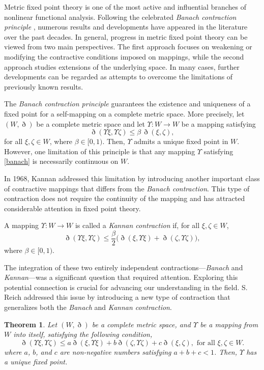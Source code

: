 \documentclass[pdflatex,sn-mathphys-num]{sn-jnl}%
\theoremstyle{thmstyleone}%
\newtheorem{theorem}{Theorem}%
\theoremstyle{thmstyletwo}%
\theoremstyle{thmstylethree}%
\begin{document}
Metric fixed point theory is one of the most active and influential branches of nonlinear functional analysis. 
Following the celebrated \textit{Banach contraction principle} \cite{banach}, numerous results and developments have appeared in the literature over the past decades. 
In general, progress in metric fixed point theory can be viewed from two main perspectives. 
The first approach focuses on weakening or modifying the contractive conditions imposed on mappings, while the second approach studies extensions of the underlying space. 
In many cases, further developments can be regarded as attempts to overcome the limitations of previously known results.

The \textit{Banach contraction principle} guarantees the existence and uniqueness of a fixed point for a self-mapping on a complete metric space. 
More precisely, let $(W,\eth)$ be a complete metric space and let $\Upsilon  : W \to W$ be a mapping satisfying
\begin{equation}\label{banach}
\eth(\Upsilon \xi,\Upsilon \zeta) \le \beta\, \eth(\xi,\zeta),
\end{equation}
for all $\xi,\zeta \in W$, where $\beta \in [0,1)$. 
Then, $\Upsilon $ admits a unique fixed point in $W$. 
However, one limitation of this principle is that any mapping $\Upsilon $ satisfying \eqref{banach} is necessarily continuous on $W$.

In 1968, Kannan \cite{kannan} addressed this limitation by introducing another important class of contractive mappings that differs from the \textit{Banach contraction}. 
This type of contraction does not require the continuity of the mapping and has attracted considerable attention in fixed point theory.

A mapping $\Upsilon  : W \to W$ is called a \emph{Kannan contraction} if, for all $\xi,\zeta \in W$,
\begin{equation}\label{kannan}
\eth(\Upsilon \xi,\Upsilon \zeta) \le \frac{\beta}{2} \big(\eth(\xi,\Upsilon \xi ) + \eth(\zeta ,\Upsilon \zeta)\big),
\end{equation}
where $\beta \in [0,1)$.

The integration of these two entirely independent contractions—\textit{Banach} and \textit{Kannan}—was a significant question that required attention. Exploring this potential connection is crucial for advancing our understanding in the field. S. Reich \cite{reich} addressed this issue by introducing a new type of contraction that generalizes both the \textit{Banach} and \textit{Kannan contraction}.
\begin{theorem}\cite{reich}
Let $(W, \eth)$ be a complete metric space, and $\Upsilon $ be a  mapping from $W$ into itself, satisfying the following condition,
\begin{equation}
\eth(\Upsilon \xi, \Upsilon \zeta) \leq a \eth(\xi, \Upsilon \xi ) + b \eth(\zeta , \Upsilon \zeta) + c \eth(\xi, \zeta), \text{ for all }  \xi,\zeta \in W.
\end{equation}
where $a$, $b$, and $c$ are non-negative numbers satisfying $a + b + c < 1$.
Then, $\Upsilon $ has a unique fixed point.		
\end{theorem}
\end{document}
